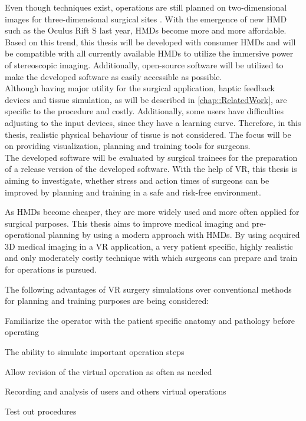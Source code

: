 Even though techniques exist, operations are still planned on two-dimensional images for three-dimensional surgical sites \cite{Steinbacher.2015}.
With the emergence of new HMD such as the Oculus Rift S last year, HMDs become more and more affordable.
Based on this trend, this thesis will be developed with consumer HMDs and will be compatible with all currently available HMDs to utilize the immersive power of stereoscopic imaging.
Additionally, open-source software will be utilized to make the developed software as easily accessible as possible. 
\\ Although having major utility for the surgical application, haptic feedback devices and tissue simulation, as will be described in \ref{chap::RelatedWork}, are specific to the procedure and costly.
Additionally, some users have difficulties adjusting to the input devices, since they have a learning curve.
Therefore, in this thesis, realistic physical behaviour of tissue is not considered.
The focus will be on providing visualization, planning and training tools for surgeons.
\\ The developed software will be evaluated by surgical trainees for the preparation of a release version of the developed software.
With the help of VR, this thesis is aiming to investigate, whether stress and action times of surgeons can be improved by planning and training in a safe and risk-free environment.

As HMDs become cheaper, they are more widely used and more often applied for surgical purposes.
This thesis aims to improve medical imaging and pre-operational planning by using a modern approach with HMDs.
By using acquired 3D medical imaging in a VR application, a very patient specific, highly realistic and only moderately costly technique with which surgeons can prepare and 
train for operations is pursued.

The following advantages of VR surgery simulations over conventional methods for planning and training purposes are being considered:
\begin{compactenum}[label=(\alph*)]
    \item Familiarize the operator with the patient specific anatomy and pathology before operating
    \item The ability to simulate important operation steps
    \item Allow revision of the virtual operation as often as needed
    \item Recording and analysis of users and others virtual operations
    \item Test out procedures
\end{compactenum}

